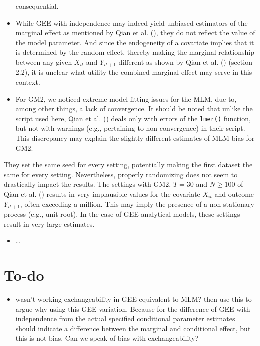 \documentclass[
  12pt,
  a4paper,
]{article}
\providecommand{\tightlist}{%
  \setlength{\itemsep}{0pt}\setlength{\parskip}{0pt}}\usepackage{longtable,booktabs,array}
\begin{document}
\begin{itemize}
  consequential.
\item
  While GEE with independence may indeed yield unbiased estimators of
  the marginal effect as mentioned by Qian et al.
  (), they do not reflect the value of the
  model parameter. And since the endogeneity of a covariate implies that
  it is determined by the random effect, thereby making the marginal
  relationship between any given \(X_{it}\) and \(Y_{it+1}\) different
  as shown by Qian et al. () (section 2.2),
  it is unclear what utility the combined marginal effect may serve in
  this context.
\item
  For GM2, we noticed extreme model fitting issues for the MLM, due to,
  among other things, a lack of convergence. It should be noted that
  unlike the script used here, Qian et al.
  () deals only with errors of the
  \texttt{lmer()} function, but not with warnings (e.g., pertaining to
  non-convergence) in their script. This discrepancy may explain the
  slightly different estimates of MLM bias for GM2.
\end{itemize}

They set the same seed for every setting, potentially making the first
dataset the same for every setting. Nevertheless, properly randomizing
does not seem to drastically impact the results. The settings with GM2,
\(T = 30\) and \(N \geq 100\) of Qian et al.
() results in very implausible values for
the covariate \(X_{it}\) and outcome \(Y_{it+1}\), often exceeding a
million. This may imply the presence of a non-stationary process (e.g.,
unit root). In the case of GEE analytical models, these settings result
in very large estimates.

\begin{itemize}
\tightlist
\item
  \ldots{}
\end{itemize}

\section{To-do}\label{to-do}

\begin{itemize}
\tightlist
\item
  wasn't working exchangeability in GEE equivalent to MLM? then use this
  to argue why using this GEE variation. Because for the difference of
  GEE with independence from the actual specified conditional parameter
  estimates should indicate a difference between the marginal and
  conditional effect, but this is not bias. Can we speak of bias with
  exchangeability?
\end{itemize}
\end{document}
